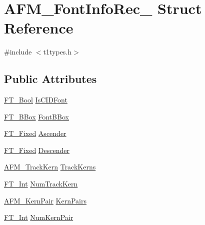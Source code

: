 \hypertarget{struct_a_f_m___font_info_rec__}{\section{A\-F\-M\-\_\-\-Font\-Info\-Rec\-\_\- Struct Reference}
\label{struct_a_f_m___font_info_rec__}
}


{\ttfamily \#include $<$t1types.\-h$>$}

\subsection*{Public Attributes}
\begin{DoxyCompactItemize}
\item 
\hyperlink{fttypes_8h_a1a832a256bb5a7e6e884afaa1a07f3ae}{F\-T\-\_\-\-Bool} \hyperlink{struct_a_f_m___font_info_rec___a6f198e74da5d8a3b7ff7518e255be231}{Is\-C\-I\-D\-Font}
\item 
\hyperlink{ftimage_8h_ae341c4eb5a7199947a13b2a1dcaf7af7}{F\-T\-\_\-\-B\-Box} \hyperlink{struct_a_f_m___font_info_rec___afa5112d6b0cc51839889206012dc1be6}{Font\-B\-Box}
\item 
\hyperlink{fttypes_8h_a5f5a679cc09f758efdd0d1c5feed3c3d}{F\-T\-\_\-\-Fixed} \hyperlink{struct_a_f_m___font_info_rec___a0b80412562435a2198a71aa4188ee85b}{Ascender}
\item 
\hyperlink{fttypes_8h_a5f5a679cc09f758efdd0d1c5feed3c3d}{F\-T\-\_\-\-Fixed} \hyperlink{struct_a_f_m___font_info_rec___a3561507200f0bc3413988af920924053}{Descender}
\item 
\hyperlink{t1types_8h_a5a8d7b59263d8628741dc7f317697766}{A\-F\-M\-\_\-\-Track\-Kern} \hyperlink{struct_a_f_m___font_info_rec___a8d9305229a1dacc15b8fceb5dbf25b9d}{Track\-Kerns}
\item 
\hyperlink{fttypes_8h_af90e5fb0d07e21be9fe6faa33f02484c}{F\-T\-\_\-\-Int} \hyperlink{struct_a_f_m___font_info_rec___a08a9207e8d4b0dd9dc0313218462f00e}{Num\-Track\-Kern}
\item 
\hyperlink{t1types_8h_ae17237ff674008488dfe0b868721a59c}{A\-F\-M\-\_\-\-Kern\-Pair} \hyperlink{struct_a_f_m___font_info_rec___a16c5da5249d4d4f68cc169469f3ee75a}{Kern\-Pairs}
\item 
\hyperlink{fttypes_8h_af90e5fb0d07e21be9fe6faa33f02484c}{F\-T\-\_\-\-Int} \hyperlink{struct_a_f_m___font_info_rec___a8ff8af3c83fbf0b060bb711b57f1affd}{Num\-Kern\-Pair}
\end{DoxyCompactItemize}


